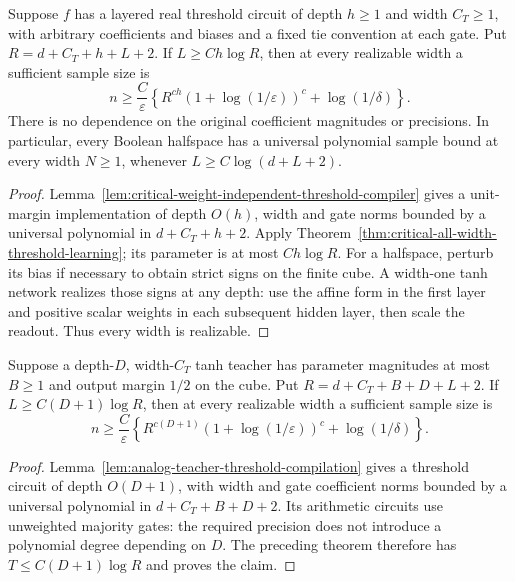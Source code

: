 \begin{corollary}
\label{cor:critical-all-width-real-threshold-learning}
Suppose $f$ has a layered real threshold circuit of depth $h\ge1$
and width $C_T\ge1$, with arbitrary coefficients and biases and a fixed
tie convention at each gate. Put $R=d+C_T+h+L+2$. If
$L\ge Ch\log R$, then at every realizable width a sufficient sample
size is
\[
 n\ge\frac C\varepsilon\left\{
 R^{ch}(1+\log(1/\varepsilon))^c+\log(1/\delta)\right\}.
\]
There is no dependence on the original coefficient magnitudes or
precisions. In particular, every Boolean halfspace has a universal
polynomial sample bound at every width $N\ge1$, whenever
$L\ge C\log(d+L+2)$.
\end{corollary}

\begin{proof}
Lemma~\ref{lem:critical-weight-independent-threshold-compiler} gives a
unit-margin implementation of depth $O(h)$, width and gate norms bounded
by a universal polynomial in $d+C_T+h+2$. Apply
Theorem~\ref{thm:critical-all-width-threshold-learning}; its parameter
is at most $Ch\log R$.
For a halfspace, perturb its bias if necessary to obtain strict signs
on the finite cube. A width-one tanh network realizes those signs at
any depth: use the affine form in the first layer and positive scalar
weights in each subsequent hidden layer, then scale the readout.
Thus every width is realizable.
\end{proof}

\begin{corollary}
\label{cor:critical-all-width-analog-teacher-learning}
Suppose a depth-$D$, width-$C_T$ tanh teacher has parameter magnitudes
at most $B\ge1$ and output margin $1/2$ on the cube. Put
$R=d+C_T+B+D+L+2$. If $L\ge C(D+1)\log R$, then at every realizable
width a sufficient sample size is
\[
 n\ge\frac C\varepsilon
 \left\{R^{c(D+1)}(1+\log(1/\varepsilon))^c+\log(1/\delta)\right\}.
\]
\end{corollary}

\begin{proof}
Lemma~\ref{lem:analog-teacher-threshold-compilation} gives a threshold
circuit of depth $O(D+1)$, with width and gate coefficient norms bounded
by a universal polynomial in $d+C_T+B+D+2$. Its arithmetic circuits
use unweighted majority gates: the required precision does not introduce
a polynomial degree depending on $D$. The preceding theorem therefore
has $T\le C(D+1)\log R$ and proves the claim.
\end{proof}


